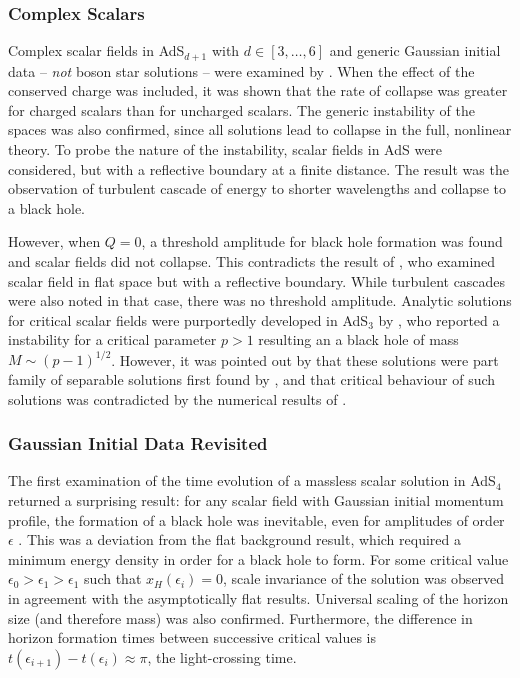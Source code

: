 \documentclass[../PhD.tex]{subfiles}
\begin{document}
\subsubsection{Complex Scalars}

Complex scalar fields in AdS$_{d+1}$ with $d \in [3,\ldots,6]$ and generic Gaussian initial data -- \emph{not} boson star solutions -- were examined by \cite{1210.0890}. When the effect of the conserved charge was included, it was shown that the rate of collapse was greater for charged scalars than for uncharged scalars. The generic instability of the spaces was also confirmed, since all solutions lead to collapse in the full, nonlinear theory. To probe the nature of the instability, scalar fields in AdS were considered, but with a reflective boundary at a finite distance. The result was the observation of turbulent cascade of energy to shorter wavelengths and collapse to a black hole. 

However, when $Q = 0$, a threshold amplitude for black hole formation was found and scalar fields did not collapse. This contradicts the result of \cite{1208.2934}, who examined scalar field in flat space but with a reflective boundary. While turbulent cascades were also noted in that case, there was no threshold amplitude. Analytic solutions for critical scalar fields were purportedly developed in AdS$_3$ by \cite{1309.1629}, who reported a instability for a critical parameter $p > 1$ resulting an a black hole of mass $M \sim (p - 1)^{1/2}$. However, it was pointed out by \cite{1401.4093} that these solutions were part family of separable solutions first found by \cite{gr-qc/0109002}, and that critical behaviour of such solutions was contradicted by the numerical results of \cite{gr-qc/0007008, gr-qc/0008060}.

\subsubsection{Gaussian Initial Data Revisited}

The first examination of the time evolution of a massless scalar solution in AdS$_4$ returned a surprising result: for any scalar field with Gaussian initial momentum profile, the formation of a black hole was inevitable, even for amplitudes of order $\epsilon$ \cite{1104.3702}. This was a deviation from the flat background result, which required a minimum energy density in order for a black hole to form. For some critical value $\epsilon_0 > \epsilon_1 > \epsilon_1$ such that $x_H(\epsilon_i) = 0$, scale invariance of the solution was observed in agreement with the asymptotically flat results. Universal scaling of the horizon size (and therefore mass) was also confirmed. Furthermore, the difference in horizon formation times between successive critical values is $t(\epsilon_{i+1}) - t(\epsilon_i) \approx \pi$, the light-crossing time.
\end{document}
